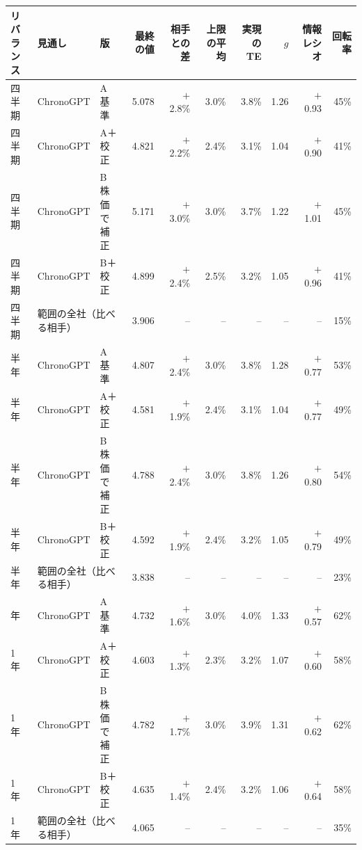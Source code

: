 \begin{tabular}{@{}lllrrrrrrr@{}}
\toprule
リバランス & 見通し & 版 & 最終の値 & 相手との差 & 上限の平均 & 実現の TE & $g$ & 情報レシオ & 回転率 \\
\midrule
四半期 & ChronoGPT & A 基準 & 5.078 & $+$2.8\% & 3.0\% & 3.8\% & 1.26 & $+$0.93 & 45\% \\
四半期 & ChronoGPT & A＋校正 & 4.821 & $+$2.2\% & 2.4\% & 3.1\% & 1.04 & $+$0.90 & 41\% \\
四半期 & ChronoGPT & B 株価で補正 & 5.171 & $+$3.0\% & 3.0\% & 3.7\% & 1.22 & $+$1.01 & 45\% \\
四半期 & ChronoGPT & B＋校正 & 4.899 & $+$2.4\% & 2.5\% & 3.2\% & 1.05 & $+$0.96 & 41\% \\
四半期 & \multicolumn{2}{l}{範囲の全社（比べる相手）} & 3.906 & -- & -- & -- & -- & -- & 15\% \\
\addlinespace
半年 & ChronoGPT & A 基準 & 4.807 & $+$2.4\% & 3.0\% & 3.8\% & 1.28 & $+$0.77 & 53\% \\
半年 & ChronoGPT & A＋校正 & 4.581 & $+$1.9\% & 2.4\% & 3.1\% & 1.04 & $+$0.77 & 49\% \\
半年 & ChronoGPT & B 株価で補正 & 4.788 & $+$2.4\% & 3.0\% & 3.8\% & 1.26 & $+$0.80 & 54\% \\
半年 & ChronoGPT & B＋校正 & 4.592 & $+$1.9\% & 2.4\% & 3.2\% & 1.05 & $+$0.79 & 49\% \\
半年 & \multicolumn{2}{l}{範囲の全社（比べる相手）} & 3.838 & -- & -- & -- & -- & -- & 23\% \\
\addlinespace
1 年 & ChronoGPT & A 基準 & 4.732 & $+$1.6\% & 3.0\% & 4.0\% & 1.33 & $+$0.57 & 62\% \\
1 年 & ChronoGPT & A＋校正 & 4.603 & $+$1.3\% & 2.3\% & 3.2\% & 1.07 & $+$0.60 & 58\% \\
1 年 & ChronoGPT & B 株価で補正 & 4.782 & $+$1.7\% & 3.0\% & 3.9\% & 1.31 & $+$0.62 & 62\% \\
1 年 & ChronoGPT & B＋校正 & 4.635 & $+$1.4\% & 2.4\% & 3.2\% & 1.06 & $+$0.64 & 58\% \\
1 年 & \multicolumn{2}{l}{範囲の全社（比べる相手）} & 4.065 & -- & -- & -- & -- & -- & 35\% \\
\bottomrule
\end{tabular}
